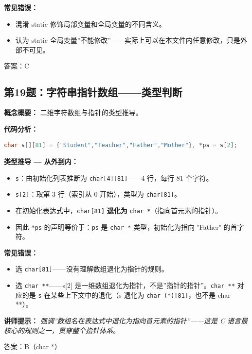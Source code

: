 \textbf{常见错误：}
\begin{itemize}
    \item 混淆 static 修饰局部变量和全局变量的不同含义。
    \item 认为 static 全局变量”不能修改”——实际上可以在本文件内任意修改，只是外部不可见。
\end{itemize}

{\color{highlight}答案：C}

\subsection{第19题：字符串指针数组——类型判断}

\textbf{概念概要：} 二维字符数组与指针的类型推导。

\textbf{代码分析：}
\begin{lstlisting}[language=C]
char s[][81] = {"Student","Teacher","Father","Mother"}, *ps = s[2];
\end{lstlisting}

\textbf{类型推导 — 从外到内：}
\begin{itemize}
    \item \texttt{s}：由初始化列表推断为 \texttt{char[4][81]}——4 行，每行 81 个字符。
    \item \texttt{s[2]}：取第 3 行（索引从 0 开始），类型为 \texttt{char[81]}。
    \item 在初始化表达式中，\texttt{char[81]} \textbf{退化为} \texttt{char *}（指向首元素的指针）。
    \item 因此 \texttt{*ps} 的声明等价于：\texttt{ps} 是 \texttt{char *} 类型，初始化为指向 "Father" 的首字符。
\end{itemize}

\textbf{常见错误：}
\begin{itemize}
    \item 选 \texttt{char[81]}——没有理解数组退化为指针的规则。
    \item 选 \texttt{char **}——s[2] 是一维数组退化为指针，不是”指针的指针”。\texttt{char **} 对应的是 \texttt{s} 在某些上下文中的退化（s 退化为 \texttt{char (*)[81]}，也不是 char **）。
\end{itemize}

\textbf{讲师提示：} \textit{强调”数组名在表达式中退化为指向首元素的指针”——这是 C 语言最核心的规则之一，贯穿整个指针体系。}

{\color{highlight}答案：B（char *）}

